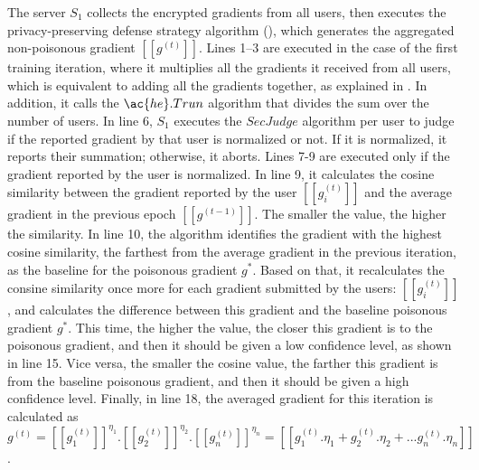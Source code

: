 The server $S_1$ collects the encrypted gradients from all users, then executes the privacy-preserving defense strategy algorithm (), which generates the aggregated non-poisonous gradient $[[g^{(t)}]]$.
Lines 1–3 are executed in the case of the first training iteration, where it multiplies all the gradients it received from all users, which is equivalent to adding all the gradients together, as explained in .
In addition, it calls the $\ac{he}.Trun$ algorithm that divides the sum over the number of users.
In line 6, $S_1$ executes the $SecJudge$ algorithm per user to judge if the reported gradient by that user is normalized or not.
If it is normalized, it reports their summation; otherwise, it aborts.
Lines 7-9 are executed only if the gradient reported by the user is normalized.
In line 9, it calculates the cosine similarity between the gradient reported by the user $[[g_i^{(t)}]]$ and the average gradient in the previous epoch $[[g^{(t-1)}]]$.
The smaller the value, the higher the similarity.
In line 10, the algorithm identifies the gradient with the highest cosine similarity, the farthest from the average gradient in the previous iteration, as the baseline for the poisonous gradient $g^*$.
Based on that, it recalculates the consine similarity once more for each gradient submitted by the users: $[[g_i^{(t)}]]$, and calculates the difference between this gradient and the baseline poisonous gradient $g^*$.
This time, the higher the value, the closer this gradient is to the poisonous gradient, and then it should be given a low confidence level, as shown in line 15.
Vice versa, the smaller the cosine value, the farther this gradient is from the baseline poisonous gradient, and then it should be given a high confidence level.
Finally, in line 18, the averaged gradient for this iteration is calculated as $g^{(t)} = [[g^{(t)}_1]]^{\eta_1} . [[g^{(t)}_2]]^{\eta_2} . [[g^{(t)}_n]]^{\eta_n} = [[g^{(t)}_1 . \eta_1 + g^{(t)}_2 . \eta_2 + ... g^{(t)}_n . \eta_n]]$.

